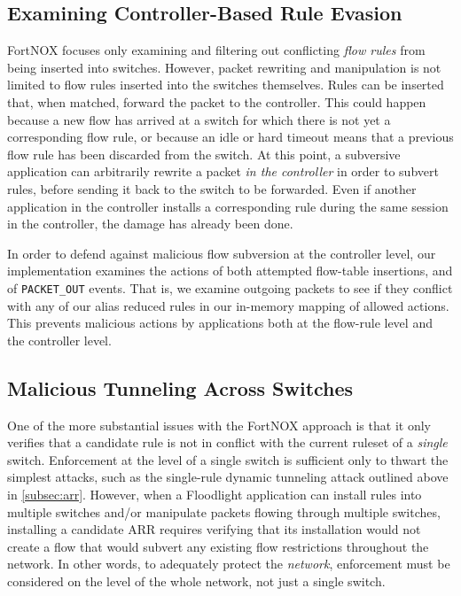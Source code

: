 \subsection{Examining Controller-Based Rule Evasion}
FortNOX focuses only examining and filtering out conflicting \emph{flow rules} from being inserted into switches. However, packet rewriting and manipulation is not limited to flow rules inserted into the switches themselves. Rules can be inserted that, when matched, forward the packet to the controller. This could happen because a new flow has arrived at a switch for which there is not yet a corresponding flow rule, or because an idle or hard timeout means that a previous flow rule has been discarded from the switch. At this point, a subversive application can arbitrarily rewrite a packet \emph{in the controller} in order to subvert rules, before sending it back to the switch to be forwarded. Even if another application in the controller installs a corresponding rule during the same session in the controller, the damage has already been done. 

In order to defend against malicious flow subversion at the controller level, our implementation examines the actions of both attempted flow-table insertions, and of \texttt{PACKET\_OUT} events. That is, we examine outgoing packets to see if they conflict with any of our alias reduced rules in our in-memory mapping of allowed actions. This prevents malicious actions by applications both at the flow-rule level and the controller level.

\subsection{Malicious Tunneling Across Switches}
One of the more substantial issues with the FortNOX approach is that it only verifies that a candidate rule is not in conflict with the current ruleset of a \emph{single} switch. Enforcement at the level of a single switch is sufficient only to thwart the simplest attacks, such as the single-rule dynamic tunneling attack outlined above in \ref{subsec:arr}. However, when a Floodlight application can install rules into multiple switches and/or manipulate packets flowing through multiple switches, installing a candidate ARR requires verifying that its installation would not create a flow that would subvert any existing flow restrictions throughout the network. In other words, to adequately protect the \emph{network}, enforcement must be considered on the level of the whole network, not just a single switch.

